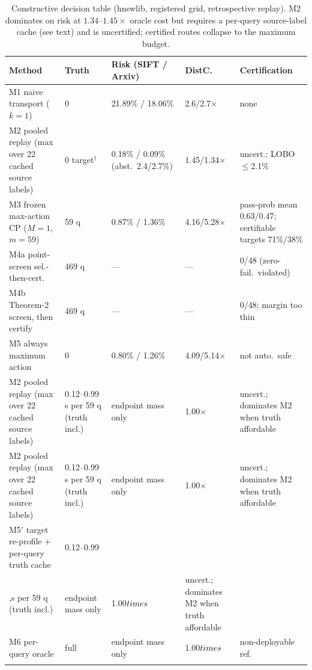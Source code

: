 \documentclass{article}
\begin{document}
\begin{table}[t]
\centering
\caption{Constructive decision table (hnswlib, registered grid, retrospective replay). M2 dominates on risk
at $1.34$--$1.45\times$ oracle cost but requires a per-query source-label cache (see text) and is
uncertified; certified routes collapse to the maximum budget.}
\label{tab:constructive}
\scriptsize
\setlength{\tabcolsep}{2.8pt}
\begin{tabular}{p{3.2cm}p{1.0cm}p{3.0cm}p{1.4cm}p{4.0cm}}
\toprule
Method & Truth & Risk (SIFT / Arxiv) & DistC. & Certification \\
\midrule
M1 naive transport ($k{=}1$) & 0 & 21.89\% / 18.06\% & 2.6/2.7$\times$ & none \\
M2 pooled replay (max over 22 cached source labels) & 0 target$^{\dagger}$ & 0.18\% / 0.09\% (abst.\ 2.4/2.7\%) & 1.45/1.34$\times$ & uncert.; LOBO $\le$2.1\% \\
M3 frozen max-action CP ($M{=}1$, $m{=}59$) & 59 q & 0.87\% / 1.36\% & 4.16/5.28$\times$ & pass-prob mean 0.63/0.47; certifiable targets 71\%/38\% \\
M4a point-screen sel.-then-cert. & 469 q & --- & --- & 0/48 (zero-fail.\ violated) \\
M4b Theorem-2 screen, then certify & 469 q & --- & --- & 0/48; margin too thin \\
M5 always maximum action & 0 & 0.80\% / 1.26\% & 4.09/5.14$\times$ & not auto.\ safe \\
M2 pooled replay (max over 22 cached source labels) & 0.12--0.99\,s per 59 q (truth incl.) & endpoint mass only & 1.00$\times$ & uncert.; dominates M2 when truth affordable \\
M2 pooled replay (max over 22 cached source labels) & 0.12--0.99\,s per 59 q (truth incl.) & endpoint mass only & 1.00$\times$ & uncert.; dominates M2 when truth affordable \\
M5$'$ target re-profile + per-query truth cache & 0.12--0.99\\,s per 59 q (truth incl.) & endpoint mass only & 1.00$\\times$ & uncert.; dominates M2 when truth affordable \\
M6 per-query oracle & full & endpoint mass only & 1.00$\\times$ & non-deployable ref. \\\\
\bottomrule
\end{tabular}
\end{table}
\end{document}
